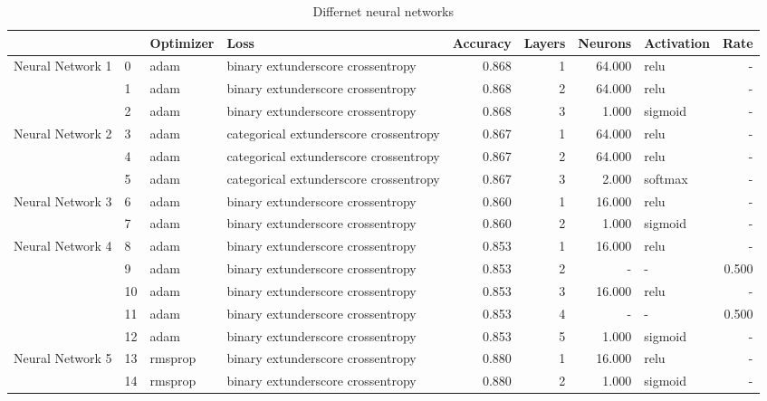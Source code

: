 \begin{table}[h!]
\caption{Differnet neural networks}
\label{tab:RawData}
\begin{tabular}{llllrrrlr}
\toprule
 &  & Optimizer & Loss & Accuracy & Layers & Neurons & Activation & Rate \\
\midrule
\multirow[t]{3}{*}{Neural Network 1} & 0 & adam & binary	extunderscore crossentropy & 0.868 & 1 & 64.000 & relu & - \\
 & 1 & adam & binary	extunderscore crossentropy & 0.868 & 2 & 64.000 & relu & - \\
 & 2 & adam & binary	extunderscore crossentropy & 0.868 & 3 & 1.000 & sigmoid & - \\
\cline{1-9}
\multirow[t]{3}{*}{Neural Network 2} & 3 & adam & categorical	extunderscore crossentropy & 0.867 & 1 & 64.000 & relu & - \\
 & 4 & adam & categorical	extunderscore crossentropy & 0.867 & 2 & 64.000 & relu & - \\
 & 5 & adam & categorical	extunderscore crossentropy & 0.867 & 3 & 2.000 & softmax & - \\
\cline{1-9}
\multirow[t]{2}{*}{Neural Network 3} & 6 & adam & binary	extunderscore crossentropy & 0.860 & 1 & 16.000 & relu & - \\
 & 7 & adam & binary	extunderscore crossentropy & 0.860 & 2 & 1.000 & sigmoid & - \\
\cline{1-9}
\multirow[t]{5}{*}{Neural Network 4} & 8 & adam & binary	extunderscore crossentropy & 0.853 & 1 & 16.000 & relu & - \\
 & 9 & adam & binary	extunderscore crossentropy & 0.853 & 2 & - & - & 0.500 \\
 & 10 & adam & binary	extunderscore crossentropy & 0.853 & 3 & 16.000 & relu & - \\
 & 11 & adam & binary	extunderscore crossentropy & 0.853 & 4 & - & - & 0.500 \\
 & 12 & adam & binary	extunderscore crossentropy & 0.853 & 5 & 1.000 & sigmoid & - \\
\cline{1-9}
\multirow[t]{2}{*}{Neural Network 5} & 13 & rmsprop & binary	extunderscore crossentropy & 0.880 & 1 & 16.000 & relu & - \\
 & 14 & rmsprop & binary	extunderscore crossentropy & 0.880 & 2 & 1.000 & sigmoid & - \\
\cline{1-9}
\bottomrule
\end{tabular}
\end{table}
